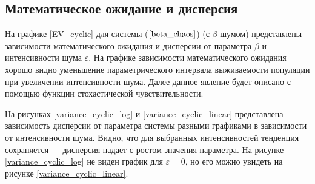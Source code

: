 \subsection{Математическое ожидание и дисперсия}

    На графике \ref{EV_cyclic} для системы (\(\ref{beta_chaos}\)) (с \(\beta\)-шумом) представлены зависимости математического ожидания и дисперсии от параметра \(\beta\) и интенсивности шума \(\varepsilon\). На графике зависимости математического ожидания хорошо видно уменьшение параметрического интервала выживаемости популяции при увеличении интенсивности шума. Далее данное явление будет описано с помощью функции стохастической чувствительности.

    На рисунках \ref{variance_cyclic_log} и \ref{variance_cyclic_linear} представлена зависимость дисперсии от параметра системы разными графиками в зависимости от интенсивности шума. Видно, что для выбранных интенсивностей тенденция сохраняется --- дисперсия падает с ростом значения параметра. На рисунке \ref{variance_cyclic_log} не виден график для \(\varepsilon = 0\), но его можно увидеть на рисунке \ref{variance_cyclic_linear}.

